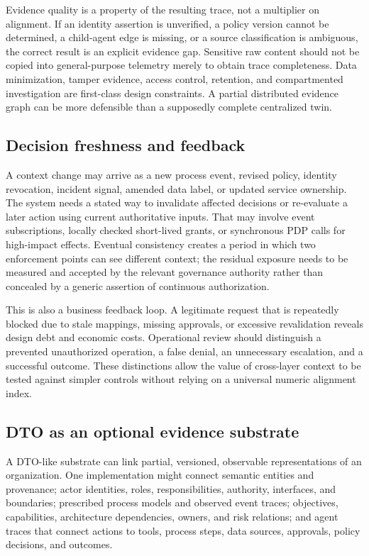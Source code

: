 \documentclass[11pt,letterpaper]{article}
\begin{document}
Evidence quality is a property of the resulting trace, not a multiplier on alignment. If an identity assertion is unverified, a policy version cannot be determined, a child-agent edge is missing, or a source classification is ambiguous, the correct result is an explicit evidence gap. Sensitive raw content should not be copied into general-purpose telemetry merely to obtain trace completeness. Data minimization, tamper evidence, access control, retention, and compartmented investigation are first-class design constraints. A partial distributed evidence graph can be more defensible than a supposedly complete centralized twin.

\subsection{Decision freshness and feedback}
A context change may arrive as a new process event, revised policy, identity revocation, incident signal, amended data label, or updated service ownership. The system needs a stated way to invalidate affected decisions or re-evaluate a later action using current authoritative inputs. That may involve event subscriptions, locally checked short-lived grants, or synchronous PDP calls for high-impact effects. Eventual consistency creates a period in which two enforcement points can see different context; the residual exposure needs to be measured and accepted by the relevant governance authority rather than concealed by a generic assertion of continuous authorization.

This is also a business feedback loop. A legitimate request that is repeatedly blocked due to stale mappings, missing approvals, or excessive revalidation reveals design debt and economic costs. Operational review should distinguish a prevented unauthorized operation, a false denial, an unnecessary escalation, and a successful outcome. These distinctions allow the value of cross-layer context to be tested against simpler controls without relying on a universal numeric alignment index.

\subsection{DTO as an optional evidence substrate}
A DTO-like substrate can link partial, versioned, observable representations of an organization. One implementation might connect semantic entities and provenance; actor identities, roles, responsibilities, authority, interfaces, and boundaries; prescribed process models and observed event traces; objectives, capabilities, architecture dependencies, owners, and risk relations; and agent traces that connect actions to tools, process steps, data sources, approvals, policy decisions, and outcomes.
\end{document}
